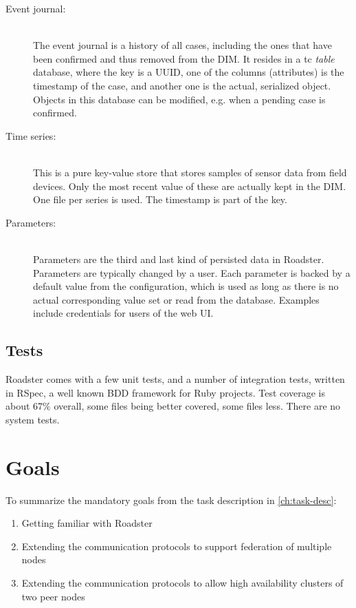 \begin{description}
	\item [ Event journal: ] \hfill\\
		The event journal is a history of all \glspl{case}, including the ones
		that have been confirmed and thus removed from the DIM. It
		resides in a \gls{tc} \emph{table} database, where the key is a
		\acrshort{UUID}, one of the columns (attributes) is the timestamp of
		the case, and another one is the actual, serialized 
		object. Objects in this database can be modified, e.g. when a
		pending case is confirmed.

	\item [ Time series: ] \hfill\\
		This is a pure key-value store that stores samples of sensor
		data from field devices. Only the most recent value of these
		are actually kept in the DIM. One file per series is used. The
		timestamp is part of the key.

	\item [ Parameters: ] \hfill\\
		Parameters are the third and last kind of persisted data in
		Roadster. Parameters are typically changed by a user. Each
		parameter is backed by a default value from the configuration,
		which is used as long as there is no actual corresponding value
		set or read from the database. Examples include credentials for
		users of the web UI.
\end{description}


\subsection{Tests}
Roadster comes with a few unit tests, and a number of integration tests,
written in RSpec, a well known \gls{BDD} framework for Ruby projects. Test coverage is
about 67\% overall, some files being better covered, some files less. There are
no system tests.

\section{Goals}\label{sec:scope:goals}
To summarize the mandatory goals from the task description in \autoref{ch:task-desc}:

\begin{enumerate}
	\item Getting familiar with Roadster
	\item Extending the communication protocols to support federation of
		multiple nodes
	\item Extending the communication protocols to allow high availability
		clusters of two peer nodes
\end{enumerate}

